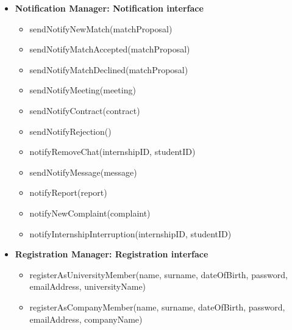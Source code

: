 \begin{itemize}
\begin{itemize}
        \item evaluateMatchProposal(matchProposal, choice)
        \item submitMeeting(form)
        \item getCandidates(internshipID)
        \item getStudentInfo(studentID)
        \item addAdmissionChoice(result)
        \item addDecision(choice)
        \item sendMessage(message)
        \item submitReport(report)
        \item submitComplaint(complaint)
        \item getStudents(universityName)
        \item interruptInternship(internshipID, studentID)
        \item postFeedback(feedback)
    \end{itemize}
    \item \textbf{Notification Manager: Notification interface}
    \begin{itemize}
        \item sendNotifyNewMatch(matchProposal)
        \item sendNotifyMatchAccepted(matchProposal)
        \item sendNotifyMatchDeclined(matchProposal)
        \item sendNotifyMeeting(meeting)
        \item sendNotifyContract(contract)
        \item sendNotifyRejection()
        \item notifyRemoveChat(internshipID, studentID)
        \item sendNotifyMessage(message)
        \item notifyReport(report)
        \item notifyNewComplaint(complaint)
        \item notifyInternshipInterruption(internshipID, studentID)
    \end{itemize}
    \item \textbf{Registration Manager: Registration interface}
    \begin{itemize}
        \item registerAsUniversityMember(name, surname, dateOfBirth, password, emailAddress, universityName)
        \item registerAsCompanyMember(name, surname, dateOfBirth, password, emailAddress, companyName)

\end{itemize}
\end{itemize}
